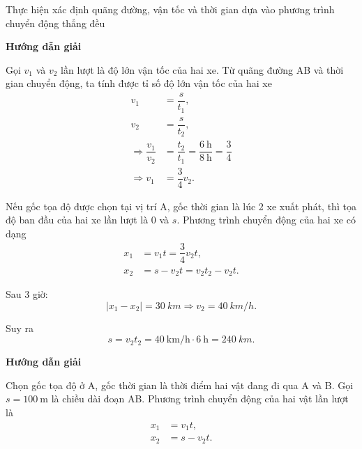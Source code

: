 \begin{dang}{Thực hiện xác định quãng đường, vận tốc và thời gian dựa vào phương trình chuyển động thẳng đều}
	{	\begin{center}
			\textbf{Hướng dẫn giải}
		\end{center}
		
		Gọi $v_1$ và $v_2$ lần lượt là độ lớn vận tốc của hai xe. Từ quãng đường AB và thời gian chuyển động, ta tính được tỉ số độ lớn vận tốc của hai xe
		\begin{align*}
			v_1&=\dfrac{s}{t_1},\\
			v_2&=\dfrac{s}{t_2},\\
			\Rightarrow \dfrac{v_1}{v_2}&=\dfrac{t_2}{t_1}=\dfrac{\SI{6}{\hour}}{\SI{8}{\hour}}=\dfrac{3}{4}\\
			\Rightarrow v_1&=\dfrac{3}{4} v_2.
		\end{align*}
		
		Nếu gốc tọa độ được chọn tại vị trí A, gốc thời gian là lúc 2 xe xuất phát, thì tọa độ ban đầu của hai xe lần lượt là 0 và $s$. Phương trình chuyển động của hai xe có dạng
		\begin{align*}
			x_1 &=v_1t=\dfrac{3}{4}v_2 t,\\
			x_2&=s-v_2t=v_2t_2-v_2t.
		\end{align*}
		
		Sau 3 giờ: $$|x_1-x_2|=\SI{30}{km} \Rightarrow v_2=\SI{40}{km/h}.$$
		
		Suy ra $$s=v_2t_2=\SI{40}{\kilo\meter/\hour}\cdot\SI{6}{\hour} =\SI{240}{km}.$$
		
	}
	
{	\begin{center}
		\textbf{Hướng dẫn giải}
	\end{center}
	
	Chọn gốc tọa độ ở A, gốc thời gian là thời điểm hai vật đang đi qua A và B. Gọi $s=\SI{100}{\meter}$ là chiều dài đoạn AB. Phương trình chuyển động của hai vật lần lượt là 
	\begin{align*}
		x_1&=v_1t,\\
		x_2&=s-v_2t.
	\end{align*}
	
}
\end{dang}
